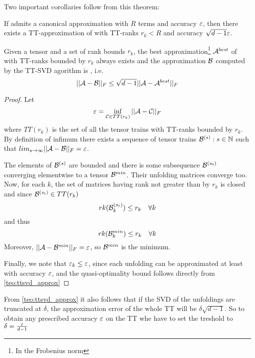 Two important corollaries follow from this theorem:
\begin{Cor}
  If \A admits a canonical approximation with $R$ terms  and accuracy $\varepsilon$, then there exists a TT-approximation of \A with TT-ranks $r_k < R$ and accuracy $\sqrt{d-1} \varepsilon$.
\end{Cor}
\begin{Cor}
  Given a tensor \A and a set of rank bounds $r_k$, the best approximation\footnote{In the Frobenius norm} $\mathcal{A}^{best}$ of \A with TT-ranks bounded by $r_k$ always exists and the approximation $\mathcal{B}$ computed by the TT-SVD agorithm is , i.e.
  \begin{equation*}
    ||\mathcal{A} - \mathcal{B}||_F \le \sqrt{d-1} ||\mathcal{A} - \mathcal{A}^{best}||_F
  \end{equation*}

  \begin{proof}
    Let
    \begin{equation*}
     \varepsilon = \inf_{\mathcal{C} \in TT(r_k)} ||\mathcal{A} - \mathcal{C}||_F
    \end{equation*}
    where $TT(r_k)$ is the set of all the tensor trains with TT-ranks bounded by $r_k$. By definition of infimum there exists a sequence of tensor trains $\mathcal{B}^{(s)} : s \in \mathbb{N}$ such that $lim_{s\to\infty} ||\mathcal{A} - \mathcal{B}||_F = \varepsilon$.

    The elements of $\mathcal{B}^{(s)}$ are bounded and  there is some subsequence $\mathcal{B}^{(s_t)}$ converging elementwise to a tensor $\mathcal{B}^{min}$. Their unfolding matrices converge too. Now, for each $k$, the set of matrices having rank not greater than by $r_k$ is closed and since $\mathcal{B}^{(s_t)} \in TT(r_k)$
    \begin{equation*}
      rk(\mathcal{B}^{(s_t)}_k) \le r_k \quad \forall k
    \end{equation*}
    and thus
    \begin{equation*}
      rk(\mathcal{B}^{min}_k) \le r_k \quad \forall k
    \end{equation*}
    Moreover, $||\mathcal{A} - \mathcal{B}^{min}||_F = \varepsilon$,  so $\mathcal{B}^{min}$ is the minimum.

    Finally, we note that $\varepsilon_k \le \varepsilon$, since each unfolding can be approximated at least with accuracy $\varepsilon$, and the quasi-optimality bound follows directly from \ref{teo:ttsvd_approx}
  \end{proof}
\end{Cor}

\begin{Cor}
  From \ref{teo:ttsvd_approx} it also follows that if the SVD of the unfoldings are truncated at $\delta$, the approximation error of the whole TT will be $\delta \sqrt{d-1}$. So to obtain any prescribed accuracy $\varepsilon$ on the TT whe have to set the treshold to $\delta = \frac{\varepsilon}{d-1}$
\end{Cor}

